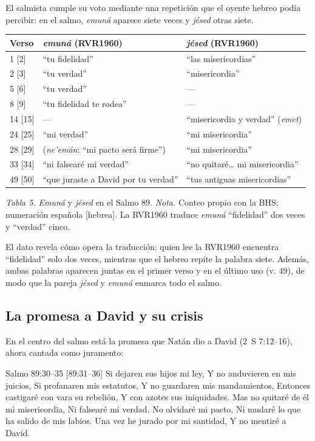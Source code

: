 El salmista cumple su voto mediante una repetición que el oyente hebreo podía percibir: en el salmo, \emph{emuná} aparece siete veces y \emph{jésed} otras siete.

\begin{center}\small\renewcommand{\arraystretch}{1.18}
\begin{tabular}{@{}L{1.6cm}L{6.4cm}L{6.4cm}@{}}
\toprule
\textbf{Verso} & \textbf{\emph{emuná}} (RVR1960) & \textbf{\emph{jésed}} (RVR1960) \\  [2] & ``tu fidelidad'' & ``las misericordias'' \\
2 [3] & ``tu verdad'' & ``misericordia'' \\
5 [6] & ``tu verdad'' & --- \\
8 [9] & ``tu fidelidad te rodea'' & --- \\
14 [15] & --- & ``misericordia y verdad'' (\emph{emet}) \\
24 [25] & ``mi verdad'' & ``mi misericordia'' \\
28 [29] & (\emph{ne'emán}: ``mi pacto será firme'') & ``mi misericordia'' \\
33 [34] & ``ni falsearé mi verdad'' & ``no quitaré\ldots{} mi misericordia'' \\
49 [50] & ``que juraste a David por tu verdad'' & ``tus antiguas misericordias'' \\
\bottomrule
\end{tabular}\par
{\footnotesize\color{gris}\textit{Tabla 5.} \emph{Emuná} y \emph{jésed} en el Salmo 89. \textit{Nota.} Conteo propio con la BHS; numeración española [hebrea]. La RVR1960 traduce \emph{emuná} ``fidelidad'' dos veces y ``verdad'' cinco.}
\end{center}

El dato revela cómo opera la traducción: quien lee la RVR1960 encuentra ``fidelidad'' solo dos veces, mientras que el hebreo repite la palabra siete. Además, ambas palabras aparecen juntas en el primer verso y en el último uso (v. 49), de modo que la pareja \emph{jésed} y \emph{emuná} enmarca todo el salmo.

\subsection{La promesa a David y su crisis}
En el centro del salmo está la promesa que Natán dio a David (2~S 7:12--16), ahora cantada como juramento:

\begin{verso}{Salmo 89:30–35 [89:31–36]}
Si dejaren sus hijos mi ley, Y no anduvieren en mis juicios, Si profanaren mis estatutos, Y no guardaren mis mandamientos, Entonces castigaré con vara su rebelión, Y con azotes sus iniquidades. Mas no quitaré de él mi misericordia, Ni falsearé mi verdad. No olvidaré mi pacto, Ni mudaré lo que ha salido de mis labios. Una vez he jurado por mi santidad, Y no mentiré a David.
\end{verso}

